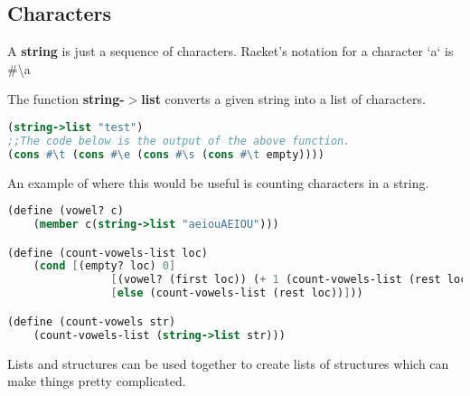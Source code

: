 \documentclass[english, 12pt]{article}
\begin{document}
\subsection{Characters}
\begin{defn}
A \textbf{string} is just a sequence of characters. Racket's notation for a character `a` is \#\textbackslash a
\end{defn}
\begin{defn}
The function \textbf{string-$>$list} converts a given string into a list of characters.
\begin{lstlisting}[language=Scheme]
(string->list "test") 
;;The code below is the output of the above function.
(cons #\t (cons #\e (cons #\s (cons #\t empty))))
\end{lstlisting}
\end{defn}
\begin{exmp}
An example of where this would be useful is counting characters in a string. 
\begin{lstlisting}[language=Scheme]
(define (vowel? c)
	(member c(string->list "aeiouAEIOU")))

(define (count-vowels-list loc)
	(cond [(empty? loc) 0]
				[(vowel? (first loc)) (+ 1 (count-vowels-list (rest loc)))]
				[else (count-vowels-list (rest loc))]))

(define (count-vowels str)
	(count-vowels-list (string->list str)))
\end{lstlisting}
\end{exmp}
\begin{note}
Lists and structures can be used together to create lists of structures which can make things pretty complicated. 
\end{note}
\end{document}
